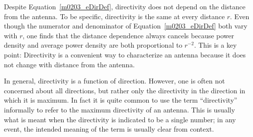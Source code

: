 Despite Equation~\ref{m0203_eDirDef}, directivity does not depend on the distance from the antenna.  
To be specific, directivity is the same at every distance $r$. 
Even though the numerator and denominator of Equation~\ref{m0203_eDirDef} both vary with $r$, one finds that the distance dependence always cancels because power density and average power density are both proportional to $r^{-2}$.  
This is a key point: Directivity is a convenient way to characterize an antenna because it does not change with distance from the antenna.

In general, directivity is a function of direction.  However,
one is often not concerned about all directions, but rather only the directivity in the direction in which it is maximum.
In fact it is quite common to use the term ``directivity'' informally to refer to the maximum directivity of an antenna.
This is usually what is meant when the directivity is indicated to be a single number;
in any event, the intended meaning of the term is usually clear from context.  

